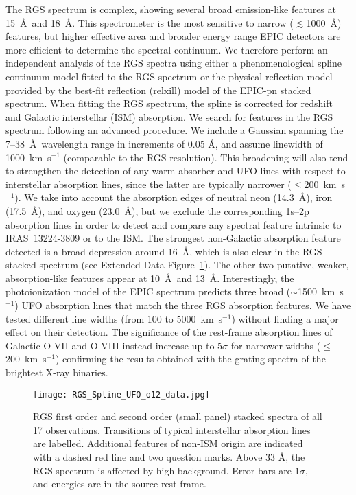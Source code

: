 \documentclass[10pt, a4paper]{article}
\begin{document}
The RGS spectrum is complex, showing several broad emission-like features at 15~\AA\ and 18~\AA . This spectrometer is the most sensitive to narrow ($\lesssim$1000~\AA ) features, but higher effective area and broader energy range EPIC detectors are more efficient to determine the spectral continuum. We therefore perform an independent analysis of the RGS spectra using either a phenomenological spline continuum model fitted to the RGS spectrum or the physical reflection model provided by the best-fit reflection (relxill) model of the EPIC-pn stacked spectrum. When fitting the RGS spectrum, the spline is corrected for redshift and Galactic interstellar (ISM) absorption. We search for features in the RGS spectrum following an advanced procedure\cite{Pinto16}. We include a Gaussian spanning the 7--38~\AA\ wavelength range in increments of 0.05 \AA , and assume linewidth of 1000~km~s$^{-1}$ (comparable to the RGS resolution). This broadening will also tend to strengthen the detection of any warm-absorber and UFO lines with respect to interstellar absorption lines, since the latter are typically narrower\cite{Pinto13} ($\leq$200~km~s$^{-1}$). We take into account the absorption edges of neutral neon (14.3~\AA ), iron (17.5~\AA ), and oxygen (23.0~\AA ), but we exclude the corresponding 1s--2p absorption lines in order to detect and compare any spectral feature intrinsic to IRAS~13224-3809 or to the ISM. The strongest non-Galactic absorption feature detected is a broad depression around 16~\AA , which is also clear in the RGS stacked spectrum (see Extended Data Figure~\ref{fig_rgs_stacked}). The other two putative, weaker, absorption-like features appear at 10~\AA\ and 13~\AA . Interestingly, the photoionization model of the EPIC spectrum predicts three broad ($\sim$1500~km~s$^{-1}$) UFO absorption lines that match the three RGS absorption features. We have tested different line widths (from 100 to 5000~km~s$^{-1}$) without finding a major effect on their detection. The significance of the rest-frame absorption lines of Galactic O VII and O VIII instead increase up to 5$\sigma$ for narrower widths ($\leq$200~km~s$^{-1}$) confirming the results obtained with the grating spectra of the brightest X-ray binaries\cite{Pinto13}.

\begin{figure}
\centering
\texttt{[image: RGS\_Spline\_UFO\_o12\_data.jpg]}
\caption{RGS first order and second order (small panel) stacked spectra of all 17
observations. Transitions of typical interstellar absorption lines are labelled. Additional features of non-ISM origin are indicated with a dashed red
line and two question marks. Above 33 \AA , the RGS spectrum is affected by high background. Error bars are $1\sigma$, and energies are in the source rest frame.
}
\label{fig_rgs_stacked}
\end{figure}
\end{document}

